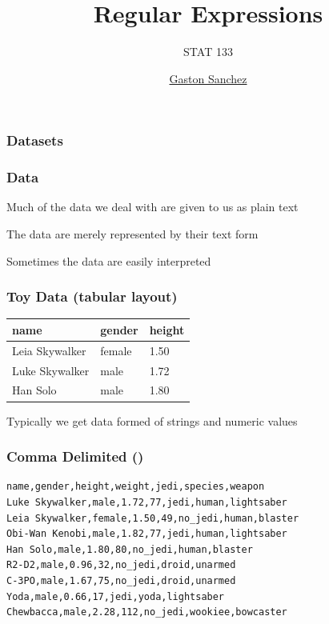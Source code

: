 \documentclass[12pt]{beamer}\usepackage[]{graphicx}\usepackage[]{color}
\title{Regular Expressions}
\subtitle{STAT 133}
\author{\href{http://www.gastonsanchez.com}{Gaston Sanchez}}
\institute{\href{https://github.com/ucb-stat133/stat133-fall-2016}{\tt \scriptsize \color{foreground} github.com/ucb-stat133/stat133-fall-2016}}
\date{}
\begin{document}
{
  \frame{
    \titlepage
  } 
}


\begin{frame}
\frametitle{Datasets}

\eb
\begin{center}
\end{center}

\end{frame}


\begin{frame}
\frametitle{Data}

\bbi
  \item Much of the data we deal with are given to us as plain text
  \item The data are merely represented by their text form
  \item Sometimes the data are easily interpreted
\ei

\end{frame}


\begin{frame}[fragile]
\frametitle{Toy Data (tabular layout)}

\begin{center}
 \begin{tabular}{| l | l | l |}
  \hline
name & gender & height \\
  \hline
Leia Skywalker & female & 1.50 \\
  \hline
Luke Skywalker & male & 1.72 \\
  \hline
Han Solo & male & 1.80 \\
  \hline
 \end{tabular}
\end{center}

\bigskip
Typically we get data formed of strings and numeric values

\end{frame}


\begin{frame}[fragile]
\frametitle{Comma Delimited ()}

{\small
\begin{verbatim}
name,gender,height,weight,jedi,species,weapon
Luke Skywalker,male,1.72,77,jedi,human,lightsaber
Leia Skywalker,female,1.50,49,no_jedi,human,blaster
Obi-Wan Kenobi,male,1.82,77,jedi,human,lightsaber
Han Solo,male,1.80,80,no_jedi,human,blaster
R2-D2,male,0.96,32,no_jedi,droid,unarmed
C-3PO,male,1.67,75,no_jedi,droid,unarmed
Yoda,male,0.66,17,jedi,yoda,lightsaber
Chewbacca,male,2.28,112,no_jedi,wookiee,bowcaster
\end{verbatim}
}

\end{frame}
\end{document}
